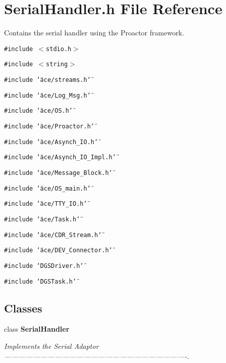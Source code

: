 \section{Serial\-Handler.h File Reference}
\label{SerialHandler_8h}
Contains the serial handler using the Proactor framework.  


{\tt \#include $<$stdio.h$>$}\par
{\tt \#include $<$string$>$}\par
{\tt \#include \char`\"{}ace/streams.h\char`\"{}}\par
{\tt \#include \char`\"{}ace/Log\_\-Msg.h\char`\"{}}\par
{\tt \#include \char`\"{}ace/OS.h\char`\"{}}\par
{\tt \#include \char`\"{}ace/Proactor.h\char`\"{}}\par
{\tt \#include \char`\"{}ace/Asynch\_\-IO.h\char`\"{}}\par
{\tt \#include \char`\"{}ace/Asynch\_\-IO\_\-Impl.h\char`\"{}}\par
{\tt \#include \char`\"{}ace/Message\_\-Block.h\char`\"{}}\par
{\tt \#include \char`\"{}ace/OS\_\-main.h\char`\"{}}\par
{\tt \#include \char`\"{}ace/TTY\_\-IO.h\char`\"{}}\par
{\tt \#include \char`\"{}ace/Task.h\char`\"{}}\par
{\tt \#include \char`\"{}ace/CDR\_\-Stream.h\char`\"{}}\par
{\tt \#include \char`\"{}ace/DEV\_\-Connector.h\char`\"{}}\par
{\tt \#include \char`\"{}DGSDriver.h\char`\"{}}\par
{\tt \#include \char`\"{}DGSTask.h\char`\"{}}\par
\subsection*{Classes}
\begin{CompactItemize}
\item 
class {\bf Serial\-Handler}
\begin{CompactList}\small\item\em Implements the Serial Adaptor ----------------------------------------------------------------------------. \item\end{CompactList}\end{CompactItemize}



